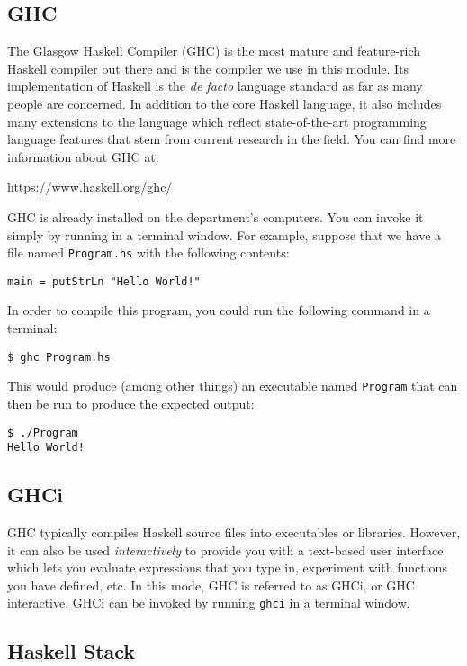 \subsection{GHC}

The Glasgow Haskell Compiler (GHC) is the most mature and feature-rich Haskell compiler out there and is the compiler we use in this module. Its implementation of Haskell is the \emph{de facto} language standard as far as many people are concerned. In addition to the core Haskell language, it also includes many extensions to the language which reflect state-of-the-art programming language features that stem from current research in the field. You can find more information about GHC at:
\begin{center}
	\url{https://www.haskell.org/ghc/}
\end{center}
GHC is already installed on the department's computers. You can invoke it simply by running  in a terminal window. For example, suppose that we have a file named \texttt{\small Program.hs} with the following contents:
\begin{verbatim}
main = putStrLn "Hello World!"
\end{verbatim}
In order to compile this program, you could run the following command in a terminal:
\begin{verbatim}
$ ghc Program.hs
\end{verbatim}
This would produce (among other things) an executable named \texttt{\small Program} that can then be run to produce the expected output:
\begin{verbatim}
$ ./Program 
Hello World!
\end{verbatim}

\subsection{GHCi}

GHC typically compiles Haskell source files into executables or libraries. However, it can also be used \emph{interactively} to provide you with a text-based user interface which lets you evaluate expressions that you type in, experiment with functions you have defined, etc. In this mode, GHC is referred to as GHCi, or GHC interactive. GHCi can be invoked by running \texttt{\small ghci} in a terminal window.

\subsection{Haskell Stack} 
\label{sec:stack}

